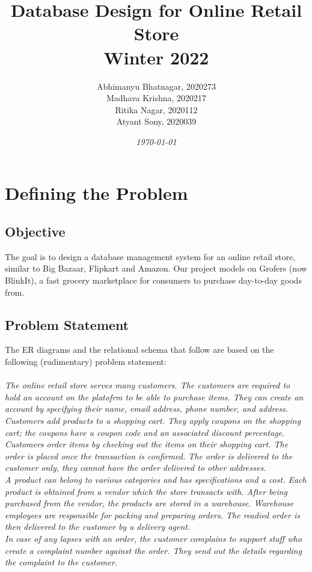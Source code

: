 \documentclass[12pt]{report}
\title{
    \textbf{Database Design for Online Retail Store\\ Winter 2022 \\}
}
\author{Abhimanyu Bhatnagar, 2020273
        \\Madhava Krishna, 2020217
        \\Ritika Nagar, 2020112
        \\Atyant Sony, 2020039}
\date{\textit{\today}}
\begin{document}
    \maketitle
    \tableofcontents
    \pagebreak

    \chapter{Defining the Problem}
    \section{Objective}
        The goal is to design a database management system for an online retail store,
        similar to Big Bazaar, Flipkart and Amazon. Our project models on Grofers (now BlinkIt), 
        a fast grocery marketplace for consumers to purchase day-to-day goods from.
    
    \section{Problem Statement}
    The ER diagrams and the relational schema that follow are based on the following (rudimentary) problem statement:
    \\\\
    \textit{
        The online retail store serves many customers. 
        The customers are required to hold an account on the platofrm to be able to purchase items.
        They can create an account by specifying their name, email address, phone number, and address.
        Customers add products to a shopping cart. They apply coupons on the shopping cart; the coupons 
        have a coupon code and an associated discount percentage.\\
        Customers order items by checking out the items on their shopping cart. The order is placed once the
         transaction is confirmed. The order is delivered to the customer only, 
         they cannot have the order delivered to other addresses.
        \\
        A product can belong to various categories and has specifications and a cost. Each
        product is obtained from a vendor which the store transacts with. After being purchased from 
        the vendor, the products are stored in a warehouse. Warehouse employees are responsible for packing 
        and preparing orders. The readied order is then delivered to the customer by a delivery agent.
        \\
        In case of any lapses with an order, the customer complains to support staff who create a complaint
        number against the order. They send out the details regarding the complaint to the customer.
    }
\end{document}

